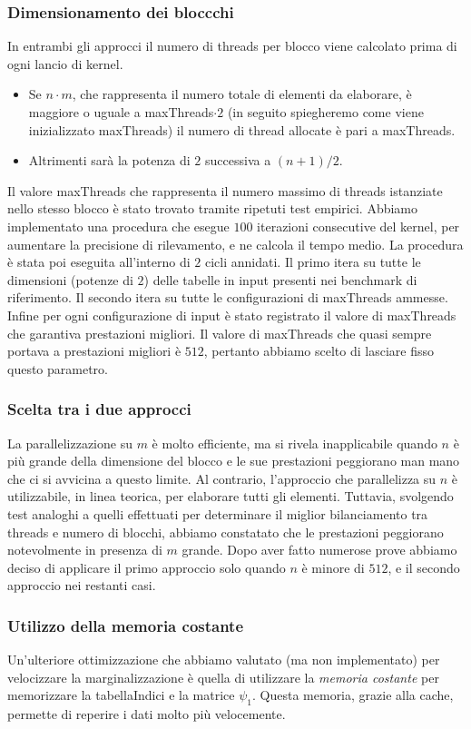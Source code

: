 \documentclass[a4paper]{article}   %
\begin{document}
\subsubsection{Dimensionamento dei bloccchi}
In entrambi gli approcci il numero di threads per blocco viene calcolato prima di ogni lancio di kernel. 
\begin{itemize}
\item Se $n \cdot m$, che rappresenta il numero totale di elementi da elaborare, è maggiore o uguale a maxThreads$ \cdot 2$ (in seguito spiegheremo come viene inizializzato maxThreads) il numero di thread allocate è pari a maxThreads.
\item Altrimenti sarà la potenza di $2$ successiva a $(n+1)/2$.
\end{itemize}
Il valore maxThreads che rappresenta il numero massimo di threads istanziate nello stesso blocco è stato trovato tramite ripetuti test empirici. Abbiamo implementato una procedura che esegue $100$ iterazioni consecutive del kernel, per aumentare la precisione di rilevamento, e ne calcola il tempo medio. La procedura è stata poi eseguita all’interno di $2$ cicli annidati. Il primo itera su tutte le dimensioni (potenze di $2$) delle tabelle in input presenti nei benchmark di riferimento. Il secondo itera su tutte le configurazioni di maxThreads ammesse. Infine per ogni configurazione di input è stato registrato il valore di maxThreads che garantiva prestazioni migliori. 
Il valore di maxThreads che quasi sempre portava a prestazioni migliori è $512$, pertanto abbiamo scelto di lasciare fisso questo parametro.

\subsubsection{Scelta tra i due approcci}
La parallelizzazione su $m$ è molto efficiente, ma si rivela inapplicabile quando $n$ è più grande della dimensione del blocco e le sue prestazioni peggiorano man mano che ci si avvicina a questo limite.
Al contrario, l’approccio che parallelizza su $n$ è utilizzabile, in linea teorica, per elaborare tutti gli elementi. Tuttavia, svolgendo test analoghi a quelli effettuati per determinare il miglior bilanciamento tra threads e numero di blocchi, abbiamo constatato che le prestazioni peggiorano notevolmente in presenza di $m$ grande. 
Dopo aver fatto numerose prove abbiamo deciso di applicare il primo approccio solo quando $n$ è minore di $512$, e il secondo approccio nei restanti casi.

\subsubsection{Utilizzo della memoria costante}
Un’ulteriore ottimizzazione che abbiamo valutato (ma non implementato) per velocizzare la marginalizzazione è quella di utilizzare la \emph{memoria costante} per memorizzare la tabellaIndici e la matrice $\psi_1$. Questa memoria, grazie alla cache, permette di reperire i dati molto più velocemente. 
\end{document}
